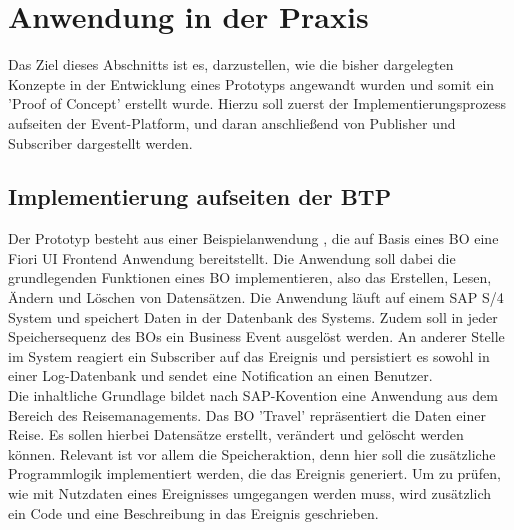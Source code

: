 \section{Anwendung in der Praxis}

\label{implementierung}
  Das Ziel dieses Abschnitts ist es, darzustellen, wie die bisher dargelegten Konzepte in der Entwicklung eines Prototyps angewandt wurden und somit ein 'Proof of Concept' erstellt wurde. Hierzu soll zuerst der Implementierungsprozess aufseiten der Event-Platform, und daran anschließend von Publisher und Subscriber dargestellt werden.\\

  \subsection{Implementierung aufseiten der BTP}
  
  Der Prototyp besteht aus einer Beispielanwendung , die auf Basis eines \ac{BO} eine Fiori UI Frontend Anwendung bereitstellt. Die Anwendung soll dabei die grundlegenden Funktionen eines \ac{BO} implementieren, also das Erstellen, Lesen, Ändern und Löschen von Datensätzen. Die Anwendung läuft auf einem SAP S/4 System und speichert Daten in der Datenbank des Systems. Zudem soll in jeder Speichersequenz des \ac{BO}s ein Business Event ausgelöst werden. An anderer Stelle im System reagiert ein Subscriber auf das Ereignis und persistiert es sowohl in einer Log-Datenbank und sendet eine Notification an einen Benutzer. \\
  Die inhaltliche Grundlage bildet nach SAP-Kovention eine Anwendung aus dem Bereich des Reisemanagements. Das \ac{BO} 'Travel' repräsentiert die Daten einer Reise. Es sollen hierbei Datensätze erstellt, verändert und gelöscht werden können. Relevant ist vor allem die Speicheraktion, denn hier soll die zusätzliche Programmlogik implementiert werden, die das Ereignis generiert. Um zu prüfen, wie mit Nutzdaten eines Ereignisses umgegangen werden muss, wird zusätzlich ein Code und eine Beschreibung in das Ereignis geschrieben.\\
  
